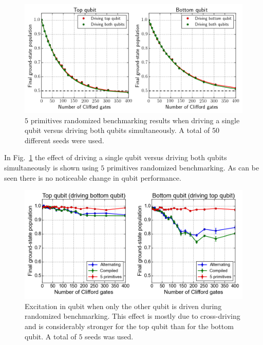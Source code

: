           \begin{figure}[tb]
            \centering
            \includegraphics[width=\textwidth]{Figures/Randomized benchmarking/RB_5p_driving_single_both.png}
            \caption{$5$ primitives randomized benchmarking results when driving a single qubit versus driving both qubits simultaneously. A total of 50 different seeds were used.}
            \label{fig:RB 5P single vs both}
          \end{figure}

          In Fig.~\ref{fig:RB 5P single vs both} the effect of driving a single qubit versus driving both qubits simultaneously is shown using $5$ primitives randomized benchmarking. As can be seen there is no noticeable change in qubit performance.

          \begin{figure}[tb]
            \centering
            \includegraphics[width=\textwidth]{Figures/Randomized benchmarking/RB_2Q_driving_single_vs_both.png}
            \caption{Excitation in qubit when only the other qubit is driven during randomized benchmarking. This effect is mostly due to cross-driving and is considerably stronger for the top qubit than for the bottom qubit. A total of $5$ seeds was used.}
            \label{fig:cross driving two qubit randomized benchmarking}
          \end{figure}

